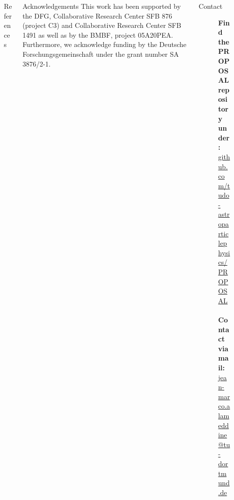 \documentclass[t]{beamer}
\begin{document}
  \vspace*{\fill}
  \begin{columns}[onlytextwidth]%
    \begin{column}{0.38\linewidth}%
      \begin{block}[equal height group=bottom, fonttitle=\normalsize]{References}
        \begin{multicols}{3}
          \footnotesize%
          \printbibliography%
        \end{multicols}
      \end{block}
    \end{column}
    \begin{column}{0.24\linewidth}%
      \begin{block}[equal height group=bottom, fonttitle=\normalsize]{Acknowledgements}
          This work has been supported by the DFG, Collaborative Research Center SFB 876 (project C3) and Collaborative Research Center SFB 1491 as well as by the BMBF, project 05A20PEA.\\
          Furthermore, we acknowledge funding by the Deutsche Forschungsgemeinschaft under the grant number SA 3876/2-1.\\
      \end{block}
    \end{column}
    \begin{column}{0.38\linewidth}%
      \begin{block}[equal height group=bottom, fonttitle=\normalsize]{Contact}
        \begin{center}
  \begin{figure}[ht]
  \begin{minipage}[ht]{0.75\linewidth}
  \textbf{Find the PROPOSAL repository under:}\\ \url{github.com/tudo-astroparticlephysics/PROPOSAL}\\
  \vspace{0.2em}\\
  \textbf{Contact via mail:}\\ \href{mailto:me@jean-marco.alameddine@tu-dortmund.de}{jean-marco.alameddine@tu-dortmund.de} 


\end{minipage}
\end{figure}
\end{center}
\end{block}
\end{column}
\end{columns}
\end{document}
